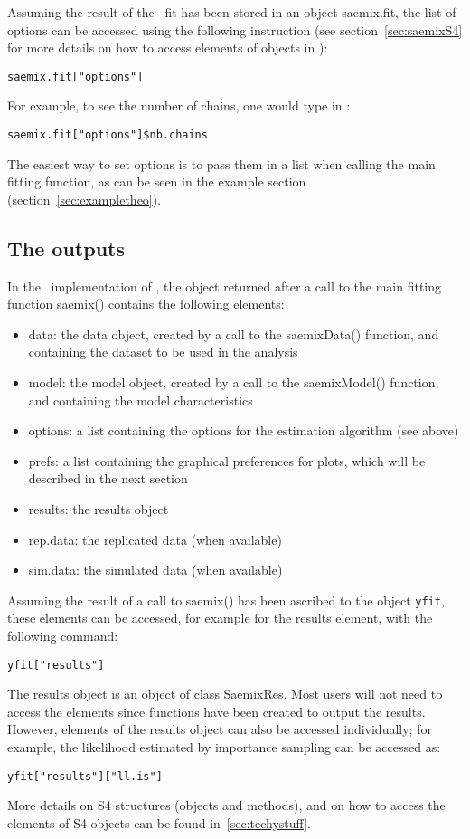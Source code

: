 Assuming the result of the \saemix~fit has been stored in an object {\sf saemix.fit}, the list of options can be accessed using the following instruction (see section~\ref{sec:saemixS4} for more details on how to access elements of objects in \R):
\begin{verbatim}
saemix.fit["options"]
\end{verbatim}
For example, to see the number of chains, one would type in \R:
\begin{verbatim}
saemix.fit["options"]$nb.chains
\end{verbatim}

The easiest way to set options is to pass them in a list when calling the main fitting function, as can be seen in the example section (section~\ref{sec:exampletheo}).

\clearpage
\subsection{The outputs}

In the \R~implementation of \saemix, the object returned after a call to the main fitting function {\sf saemix()} contains the following elements:
\begin{itemize}
\item data: the data object, created by a call to the {\sf saemixData()} function, and containing the dataset to be used in the analysis
\item model: the model object, created by a call to the {\sf saemixModel()} function, and containing the model characteristics
\item options: a list containing the options for the estimation algorithm (see above)
\item prefs: a list containing the graphical preferences for plots, which will be described in the next section
\item results: the results object
\item rep.data: the replicated data (when available)
\item sim.data: the simulated data (when available)
\end{itemize}
Assuming the result of a call to {\sf saemix()} has been ascribed to the object \verb+yfit+, these elements can be accessed, for example for the results element, with the following command:
\begin{verbatim}
yfit["results"]
\end{verbatim}
The results object is an object of class {\sf SaemixRes}. Most users will not need to access the elements since functions have been created to output the results. However, elements of the results object can also be accessed individually; for example, the likelihood estimated by importance sampling can be accessed as:
\begin{verbatim}
yfit["results"]["ll.is"]
\end{verbatim}
More details on S4 structures (objects and methods), and on how to access the elements of S4 objects can be found in~\ref{sec:techystuff}.

